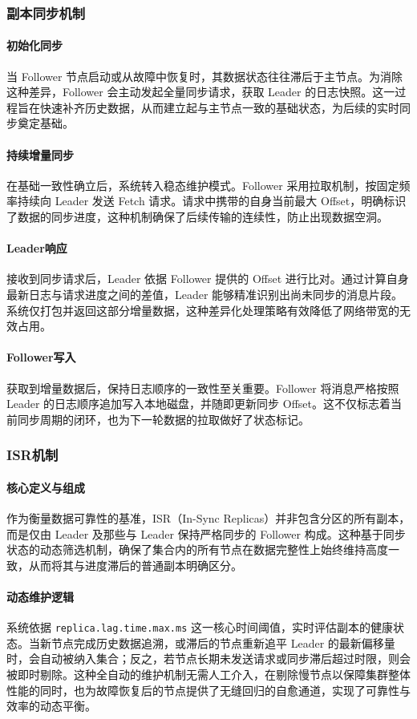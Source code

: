 		\subsubsection{副本同步机制}
			\paragraph{初始化同步}
			当 Follower 节点启动或从故障中恢复时，其数据状态往往滞后于主节点。为消除这种差异，Follower 会主动发起全量同步请求，获取 Leader 的日志快照。这一过程旨在快速补齐历史数据，从而建立起与主节点一致的基础状态，为后续的实时同步奠定基础。
			\paragraph{持续增量同步}
			在基础一致性确立后，系统转入稳态维护模式。Follower 采用拉取机制，按固定频率持续向 Leader 发送 Fetch 请求。请求中携带的自身当前最大 Offset，明确标识了数据的同步进度，这种机制确保了后续传输的连续性，防止出现数据空洞。
			\paragraph{Leader响应}
			接收到同步请求后，Leader 依据 Follower 提供的 Offset 进行比对。通过计算自身最新日志与请求进度之间的差值，Leader 能够精准识别出尚未同步的消息片段。系统仅打包并返回这部分增量数据，这种差异化处理策略有效降低了网络带宽的无效占用。
			\paragraph{Follower写入}
			获取到增量数据后，保持日志顺序的一致性至关重要。Follower 将消息严格按照 Leader 的日志顺序追加写入本地磁盘，并随即更新同步 Offset。这不仅标志着当前同步周期的闭环，也为下一轮数据的拉取做好了状态标记。
		\subsubsection{ISR机制}
			\paragraph{核心定义与组成}
			作为衡量数据可靠性的基准，ISR（In-Sync Replicas）并非包含分区的所有副本，而是仅由 Leader 及那些与 Leader 保持严格同步的 Follower 构成。这种基于同步状态的动态筛选机制，确保了集合内的所有节点在数据完整性上始终维持高度一致，从而将其与进度滞后的普通副本明确区分。
			
			\paragraph{动态维护逻辑}
			系统依据 \texttt{replica.lag.time.max.ms} 这一核心时间阈值，实时评估副本的健康状态。当新节点完成历史数据追溯，或滞后的节点重新追平 Leader 的最新偏移量时，会自动被纳入集合；反之，若节点长期未发送请求或同步滞后超过时限，则会被即时剔除。这种全自动的维护机制无需人工介入，在剔除慢节点以保障集群整体性能的同时，也为故障恢复后的节点提供了无缝回归的自愈通道，实现了可靠性与效率的动态平衡。
			
